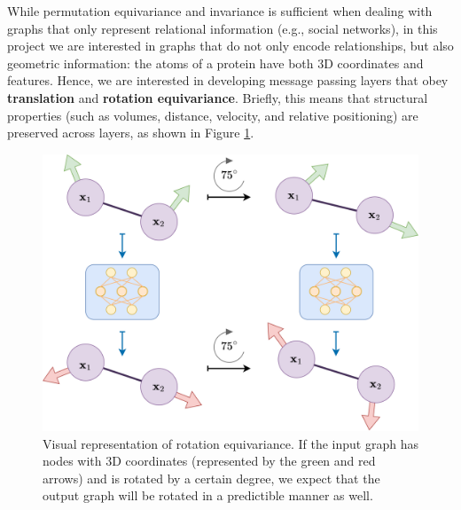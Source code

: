 While permutation equivariance and invariance is sufficient when dealing with graphs that only represent relational information (e.g., social networks), in this project we are interested in graphs that do not only encode relationships, but also geometric information: the atoms of a protein have both 3D coordinates and features.
Hence, we are interested in developing message passing layers that obey \textbf{translation} and \textbf{rotation equivariance}. Briefly, this means that structural properties (such as volumes, distance, velocity, and relative positioning) are preserved across layers, as shown in Figure \ref{equivariance}. 
\begin{figure}
    \centering
    \includegraphics[scale=0.7]{figures/equivariance-2.png}
    \caption{Visual representation of rotation equivariance. If the input graph has nodes with 3D coordinates (represented by the green and red arrows) and is rotated by a certain degree, we expect that the output graph will be rotated in a predictible manner as well.}
    \label{equivariance}
\end{figure}

